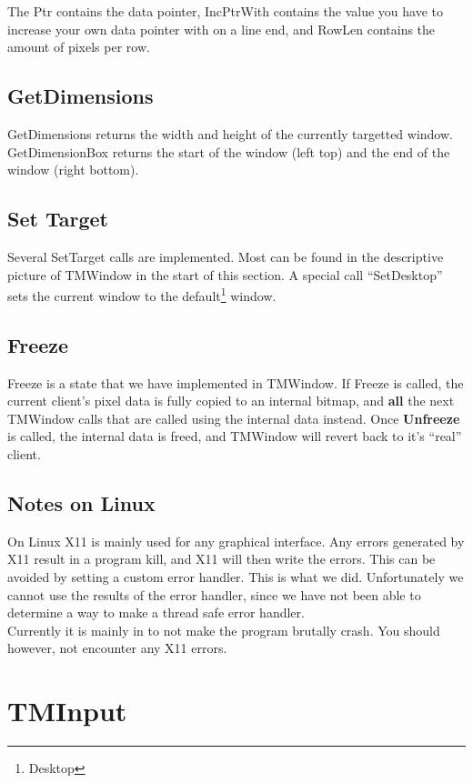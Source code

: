 \documentclass[a4paper]{report}
\begin{document}
The Ptr contains the data pointer, IncPtrWith contains the value you have to
increase your own data pointer with on a line end, and RowLen contains the
amount of pixels per row. 

\subsection{GetDimensions}

GetDimensions returns the width and height of the currently targetted window.
GetDimensionBox returns the start of the window (left top) and the end of the
window (right bottom).

\subsection{Set Target}

Several SetTarget calls are implemented. Most can be found in the descriptive
picture of TMWindow in the start of this section.
A special call ``SetDesktop'' sets the current window to the
default\footnote{Desktop} window.

\subsection{Freeze}

Freeze is a state that we have implemented in TMWindow. If Freeze is called, the
current client's pixel data is fully copied to an internal bitmap, and
\textbf{all} the next TMWindow calls that are called using the internal data
instead. Once \textbf{Unfreeze} is called, the internal data is freed, and
TMWindow will revert back to it's ``real'' client.

\subsection{Notes on Linux}

On Linux X11 is mainly used for any graphical interface. Any errors generated
by X11 result in a program kill, and X11 will then write the errors. This can be
avoided by setting a custom error handler. This is what we did. Unfortunately we
cannot use the results of the error handler, since we have not been able to
determine a way to make a thread safe error handler. \\
Currently it is mainly in to not make the program brutally crash. You should
however, not encounter any X11 errors.

\section{TMInput}
\end{document}
